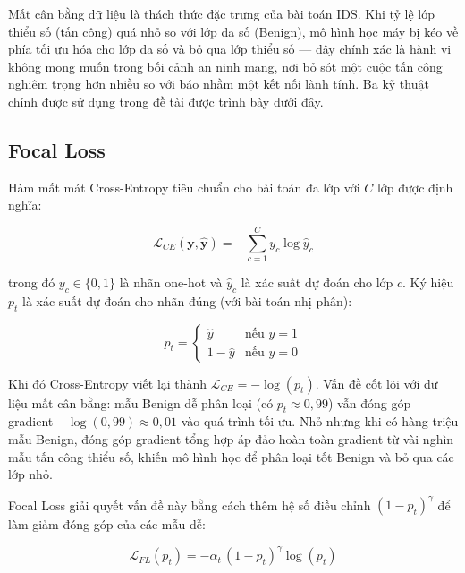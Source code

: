 \documentclass[../DoAn.tex]{subfiles}
\begin{document}
Mất cân bằng dữ liệu là thách thức đặc trưng của bài toán IDS. Khi tỷ lệ lớp thiểu số (tấn công) quá nhỏ so với lớp đa số (Benign), mô hình học máy bị kéo về phía tối ưu hóa cho lớp đa số và bỏ qua lớp thiểu số --- đây chính xác là hành vi không mong muốn trong bối cảnh an ninh mạng, nơi bỏ sót một cuộc tấn công nghiêm trọng hơn nhiều so với báo nhầm một kết nối lành tính. Ba kỹ thuật chính được sử dụng trong đề tài được trình bày dưới đây.

\subsection{Focal Loss}
\label{subsec:focal-loss}

Hàm mất mát Cross-Entropy tiêu chuẩn cho bài toán đa lớp với $C$ lớp được định nghĩa:

\begin{equation}
    \mathcal{L}_{CE}(\mathbf{y}, \hat{\mathbf{y}}) = -\sum_{c=1}^{C} y_c \log \hat{y}_c
    \label{eq:ce}
\end{equation}

trong đó $y_c \in \{0,1\}$ là nhãn one-hot và $\hat{y}_c$ là xác suất dự đoán cho lớp $c$. Ký hiệu $p_t$ là xác suất dự đoán cho nhãn đúng (với bài toán nhị phân):

\begin{equation}
    p_t = \begin{cases} \hat{y} & \text{nếu } y = 1 \\ 1 - \hat{y} & \text{nếu } y = 0 \end{cases}
    \label{eq:pt}
\end{equation}

Khi đó Cross-Entropy viết lại thành $\mathcal{L}_{CE} = -\log(p_t)$. Vấn đề cốt lõi với dữ liệu mất cân bằng: mẫu Benign dễ phân loại (có $p_t \approx 0{,}99$) vẫn đóng góp gradient $-\log(0{,}99) \approx 0{,}01$ vào quá trình tối ưu. Nhỏ nhưng khi có hàng triệu mẫu Benign, đóng góp gradient tổng hợp áp đảo hoàn toàn gradient từ vài nghìn mẫu tấn công thiểu số, khiến mô hình học để phân loại tốt Benign và bỏ qua các lớp nhỏ.

Focal Loss \cite{lin2017focal} giải quyết vấn đề này bằng cách thêm hệ số điều chỉnh $(1 - p_t)^\gamma$ để làm giảm đóng góp của các mẫu dễ:

\begin{equation}
    \mathcal{L}_{FL}(p_t) = -\alpha_t\, (1 - p_t)^\gamma \log(p_t)
    \label{eq:focal-loss}
\end{equation}
\end{document}
